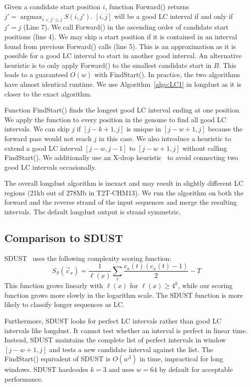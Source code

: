 \documentclass[webpdf,contemporary,large,namedate]{oup-authoring-template}%
\DeclareMathOperator*{\argmax}{argmax}
\begin{document}
Given a candidate start position $i$,
function {\sc Forward}() returns $j'=\argmax_{i<j'\le j} S(i,j')$.
$[i,j]$ will be a good LC interval if and only if $j'=j$ (Line 7).
We call {\sc Forward}() in the ascending order of candidate start positions (line 4).
We may skip a start position if it is contained in an interval found from previous {\sc Forward}() calls (line 5).
This is an approximation as it is possible for a good LC interval to start in another good interval.
An alternative heuristic is to only apply {\sc Forward}() to the smallest candidate start in $B$.
This leads to a guaranteed $O(w)$ with {\sc FindStart}().
In practice, the two algorithms have almost identical runtime.
We use Algorithm~\ref{algo:LC1} in longdust as it is closer to the exact algorithm.

Function {\sc FindStart}() finds the longest good LC interval ending at one position.
We apply the function to every position in the genome to find all good LC intervals.
We can skip $j$ if $[j-k+1,j]$ is unique in $[j-w+1,j]$ because the forward pass would not reach $j$ in this case.
We also introduce a heuristic to extend a good LC interval $[j-w,j-1]$ to $[j-w+1,j]$ without calling {\sc FindStart}().
We additionally use an X-drop heuristic~\citep{Altschul:1997vn} to avoid connecting two good LC intervals occasionally.

The overall longdust algorithm is inexact and may result in slightly different LC regions (21kb out of 278Mb in T2T-CHM13).
We run the algorithm on both the forward and the reverse strand of the input sequences and merge the resulting intervals.
The default longdust output is strand symmetric.

\subsection{Comparison to SDUST}

SDUST~\citep{Morgulis:2006aa} uses the following complexity scoring function:
$$
S_S(\vec{c}_x)=\frac{1}{\ell(x)}\sum_t\frac{c_x(t)(c_x(t)-1)}{2}-T
$$
This function grows linearly with $\ell(x)$ for $\ell(x)\ge4^k$,
while our scoring function grows more slowly in the logarithm scale.
The SDUST function is more likely to classify longer sequences as LC.

Furthermore, SDUST looks for perfect LC intervals rather than good LC intervals like longdust.
It cannot test whether an interval is perfect in linear time.
Instead, SDUST maintains the complete list of perfect intervals in window $[j-w+1,j]$
and tests a new candidate interval against the list.
The {\sc FindStart}() equivalent of SDUST is $O(w^3)$ in time, impractical for long windows.
SDUST hardcodes $k=3$ and uses $w=64$ by default for acceptable performance.
\end{document}
